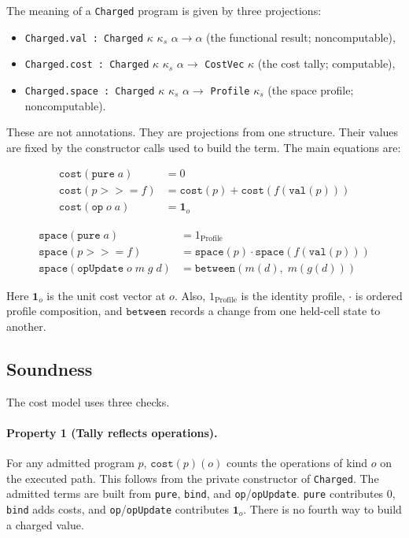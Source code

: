 \documentclass[acmsmall,nonacm]{acmart}
\begin{document}
The meaning of a \lstinline{Charged} program is given by three projections:

\begin{itemize}
  \item \lstinline{Charged.val : Charged} $\kappa$ $\kappa_s$ $\alpha \to \alpha$ (the functional result; noncomputable),
  \item \lstinline{Charged.cost : Charged} $\kappa$ $\kappa_s$ $\alpha \to$ \lstinline{CostVec} $\kappa$ (the cost tally; computable),
  \item \lstinline{Charged.space : Charged} $\kappa$ $\kappa_s$ $\alpha \to$ \lstinline{Profile} $\kappa_s$ (the space profile; noncomputable).
\end{itemize}

These are not annotations.
They are projections from one structure.
Their values are fixed by the constructor calls used to build the term.
The main equations are:

\begin{align*}
\texttt{cost}(\texttt{pure}\; a) &= 0 \\
\texttt{cost}(p \mathbin{>\!\!>\!\!=} f) &= \texttt{cost}(p) + \texttt{cost}(f(\texttt{val}(p))) \\
\texttt{cost}(\texttt{op}\; o\; a) &= \mathbf{1}_o
\end{align*}

\begin{align*}
\texttt{space}(\texttt{pure}\; a) &= 1_{\text{Profile}} \\
\texttt{space}(p \mathbin{>\!\!>\!\!=} f) &= \texttt{space}(p) \cdot \texttt{space}(f(\texttt{val}(p))) \\
\texttt{space}(\texttt{opUpdate}\; o\; m\; g\; d) &= \texttt{between}(m(d),\; m(g(d)))
\end{align*}

Here $\mathbf{1}_o$ is the unit cost vector at $o$.
Also, $1_{\text{Profile}}$ is the identity profile, $\cdot$ is ordered profile composition, and $\texttt{between}$ records a change from one held-cell state to another.

\subsection{Soundness}\label{sec:soundness}

The cost model uses three checks.

\paragraph{Property 1 (Tally reflects operations).}
For any admitted program $p$, $\texttt{cost}(p)(o)$ counts the operations of kind $o$ on the executed path.
This follows from the private constructor of \lstinline{Charged}.
The admitted terms are built from \lstinline{pure}, \lstinline{bind}, and \lstinline{op}/\lstinline{opUpdate}.
\lstinline{pure} contributes 0, \lstinline{bind} adds costs, and \lstinline{op}/\lstinline{opUpdate} contributes $\mathbf{1}_o$.
There is no fourth way to build a charged value.
\end{document}
